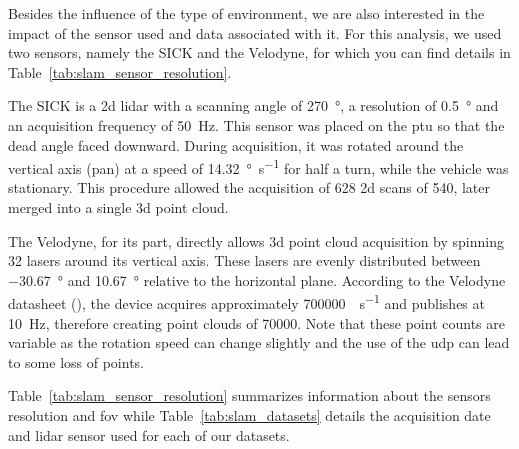 Besides the influence of the type of environment, we are also interested in the impact of the sensor used and data associated with it. For this analysis, we used two sensors, namely the SICK and the Velodyne, for which you can find details in Table~\ref{tab:slam_sensor_resolution}.

The SICK is a \gls*{2d} \gls*{lidar} with a scanning angle of \SI{270}{\degree}, a resolution of \SI{0.5}{\degree} and an acquisition frequency of \SI{50}{\hertz}. This sensor was placed on the \gls*{ptu} so that the dead angle faced downward. During acquisition, it was rotated around the vertical axis (pan) at a speed of \SI{14.32}{\degree\per\second} for half a turn, while the vehicle was stationary. This procedure allowed the acquisition of 628 \gls*{2d} scans of \SI{540}{\points}, later merged into a single \gls*{3d} point cloud.

The Velodyne, for its part, directly allows \gls*{3d} point cloud acquisition by spinning 32 lasers around its vertical axis. These lasers are evenly distributed between \SI{-30.67}{\degree} and \SI{10.67}{\degree} relative to the horizontal plane. According to the Velodyne datasheet (\cite{VelodyneDatasheet}), the device acquires approximately \SI{700000}{\points\per\second} and publishes at \SI{10}{\hertz}, therefore creating point clouds of \SI{70000}{\points}. Note that these point counts are variable as the rotation speed can change slightly and the use of the \gls*{udp} can lead to some loss of points.

Table~\ref{tab:slam_sensor_resolution} summarizes information about the sensors resolution and \gls*{fov} while Table~\ref{tab:slam_datasets} details the acquisition date and \gls*{lidar} sensor used for each of our datasets.

